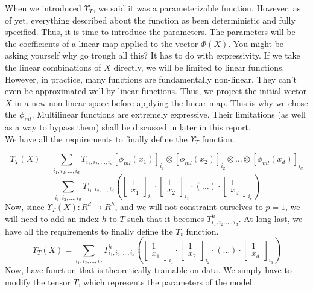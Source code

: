 \documentclass{article}
\theoremstyle{definition}
\theoremstyle{definition}
\begin{document}
When we introduced $\Upsilon_{T}$, we said it was a parameterizable function. However, as of yet, everything described about the function as been deterministic and fully specified. Thus, it is time to introduce the parameters. The parameters will be the coefficients of a linear map applied to the vector $\Phi(X)$. You might be asking yourself why go trough all this? It has to do with expressivity. If we take the linear combinations of $X$ directly, we will be limited to linear functions. However, in practice, many functions are fundamentally non-linear. They can't even be approximated well by linear functions. Thus, we project the initial vector $X$ in a new non-linear space before applying the linear map. This is why we chose the $\phi_{ml}$. Multilinear functions are extremely expressive. Their limitations (as well as a way to bypass them) shall be discussed in later in this report. \\ We have all the requirements to finally define the $\Upsilon_{T}$ function. 

\[
    \Upsilon_T(X) = \sum_{i_1, i_2, \dots, i_d} T_{i_1, i_2, \dots, i_d}
    \left[\phi_{ml}(x_1)\right]_{i_1}\otimes \left[\phi_{ml}(x_2)\right]_{i_2} \otimes \dots \otimes \left[\phi_{ml}(x_d)\right]_{i_d}
\]
\[
    \sum_{i_1, i_2, \dots, i_d} T_{i_1, i_2, \dots, i_d}
    \left(
    \begin{bmatrix}
        1 \\ x_1
    \end{bmatrix}_{i_1}
    \cdot
    \begin{bmatrix}
        1 \\ x_2
    \end{bmatrix}_{i_2}
    \cdot
    (\dots)
    \cdot
    \begin{bmatrix}
        1 \\ x_d
    \end{bmatrix}_{i_e}
    \right)
\]
Now, since $\Upsilon_T(X): R^d \to R^h$, and we will not constraint ourselves to $p=1$, we will need to add an index $h$ to $T$ such that it becomes $T^{h}_{i_1, i_2, \dots, i_d}$. At long last, we have all the requirements to finally define the $\Upsilon_t$ function. 
\[
    \Upsilon_T(X) =     \sum_{i_1, i_2, \dots, i_d} T^{h}_{i_1, i_2, \dots, i_d}
    \left(
    \begin{bmatrix}
        1 \\ x_1
    \end{bmatrix}_{i_1}
    \cdot
    \begin{bmatrix}
        1 \\ x_2
    \end{bmatrix}_{i_2}
    \cdot
    (\dots)
    \cdot
    \begin{bmatrix}
        1 \\ x_d
    \end{bmatrix}_{i_d}
    \right)
\]
Now, have function that is theoretically trainable on data. We simply have to modify the tensor $T$, which represents the parameters of the model.
\end{document}
